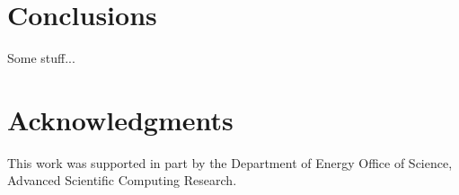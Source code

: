 \documentclass{acm_proc_article-sp}
\begin{document}

%
%

%
%
%

\section{Conclusions}

Some stuff...



\section{Acknowledgments}
This work was supported in part by the Department of Energy Office of Science,
Advanced Scientific Computing Research.


%
%

\balancecolumns
\end{document}
